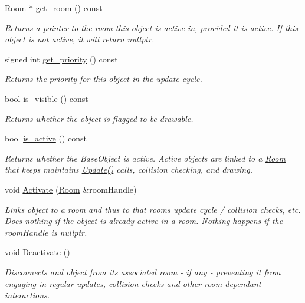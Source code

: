 \begin{DoxyCompactItemize}
\item 
\hyperlink{class_helios_1_1_room}{Room} $\ast$ \hyperlink{class_helios_1_1_base_obj_a896030076cb96c794f4b202cca0ec584}{get\+\_\+room} () const 
\begin{DoxyCompactList}\small\item\em Returns a pointer to the room this object is active in, provided it is active. If this object is not active, it will return nullptr. \end{DoxyCompactList}\item 
signed int \hyperlink{class_helios_1_1_base_obj_abf2a6d187e1c8329bb8e24256218aecb}{get\+\_\+priority} () const 
\begin{DoxyCompactList}\small\item\em Returns the priority for this object in the update cycle. \end{DoxyCompactList}\item 
bool \hyperlink{class_helios_1_1_base_obj_a418fb8f5e8aa25f0969e37e24cadb8c9}{is\+\_\+visible} () const 
\begin{DoxyCompactList}\small\item\em Returns whether the object is flagged to be drawable. \end{DoxyCompactList}\item 
bool \hyperlink{class_helios_1_1_base_obj_a8c748b30dca39c303e8bb9085f9d6d15}{is\+\_\+active} () const 
\begin{DoxyCompactList}\small\item\em Returns whether the Base\+Object is active. Active objects are linked to a \hyperlink{class_helios_1_1_room}{Room} that keeps maintains \hyperlink{class_helios_1_1_base_obj_aa42e26e872234b6871d159c29afdef17}{Update()} calls, collision checking, and drawing. \end{DoxyCompactList}\item 
void \hyperlink{class_helios_1_1_base_obj_a7823cb052c6c97f4aab120f6eb864392}{Activate} (\hyperlink{class_helios_1_1_room}{Room} \&room\+Handle)
\begin{DoxyCompactList}\small\item\em Links object to a room and thus to that room\textquotesingle{}s update cycle / collision checks, etc. Does nothing if the object is already active in a room. Nothing happens if the room\+Handle is nullptr. \end{DoxyCompactList}\item 
void \hyperlink{class_helios_1_1_base_obj_ade0a810a861f41a43adf0e7c766951d1}{Deactivate} ()
\begin{DoxyCompactList}\small\item\em Disconnects and object from its associated room -\/ if any -\/ preventing it from engaging in regular updates, collision checks and other room dependant interactions. \end{DoxyCompactList}\item 

\end{DoxyCompactItemize}
